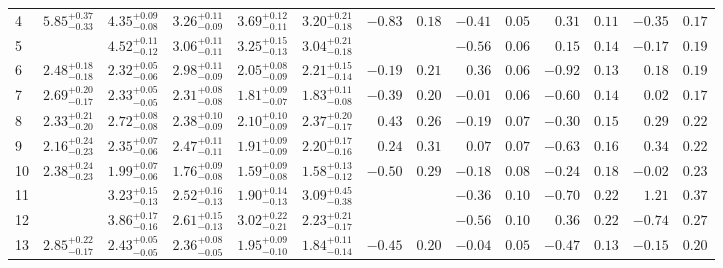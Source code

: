 \begin{tabular}{@{}l ccccc r@{ $\pm$ }l r@{ $\pm$ }l r@{ $\pm$ }l r@{ $\pm$ }l @{}}
\cmidrule{1-14}
4 & ${5.85}^{+0.37}_{-0.33}$ & ${4.35}^{+0.09}_{-0.08}$ & ${3.26}^{+0.11}_{-0.09}$ & ${3.69}^{+0.12}_{-0.11}$ & ${3.20}^{+0.21}_{-0.18}$
  & $-0.83$ & $0.18$ & $-0.41$ & $0.05$ & $0.31$ & $0.11$ & $-0.35$ & $0.17$ \\ [0.5em]
5 & {} & ${4.52}^{+0.11}_{-0.12}$ & ${3.06}^{+0.11}_{-0.11}$ & ${3.25}^{+0.15}_{-0.13}$ & ${3.04}^{+0.21}_{-0.18}$
  & \multicolumn{2}{c}{} & $-0.56$ & $0.06$ & $0.15$ & $0.14$ & $-0.17$ & $0.19$ \\ [0.5em]
6 & ${2.48}^{+0.18}_{-0.18}$ & ${2.32}^{+0.05}_{-0.06}$ & ${2.98}^{+0.11}_{-0.09}$ & ${2.05}^{+0.08}_{-0.09}$ & ${2.21}^{+0.15}_{-0.14}$
  & $-0.19$ & $0.21$ & $0.36$ & $0.06$ & $-0.92$ & $0.13$ & $0.18$ & $0.19$ \\ [0.5em]
7 & ${2.69}^{+0.20}_{-0.17}$ & ${2.33}^{+0.05}_{-0.05}$ & ${2.31}^{+0.08}_{-0.08}$ & ${1.81}^{+0.09}_{-0.07}$ & ${1.83}^{+0.11}_{-0.08}$
  & $-0.39$ & $0.20$ & $-0.01$ & $0.06$ & $-0.60$ & $0.14$ & $0.02$ & $0.17$ \\ [0.5em]
8 & ${2.33}^{+0.21}_{-0.20}$ & ${2.72}^{+0.08}_{-0.08}$ & ${2.38}^{+0.10}_{-0.09}$ & ${2.10}^{+0.10}_{-0.09}$ & ${2.37}^{+0.20}_{-0.17}$
  & $0.43$ & $0.26$ & $-0.19$ & $0.07$ & $-0.30$ & $0.15$ & $0.29$ & $0.22$ \\ [0.5em]
9 & ${2.16}^{+0.24}_{-0.23}$ & ${2.35}^{+0.07}_{-0.06}$ & ${2.47}^{+0.11}_{-0.11}$ & ${1.91}^{+0.09}_{-0.09}$ & ${2.20}^{+0.17}_{-0.16}$
  & $0.24$ & $0.31$ & $0.07$ & $0.07$ & $-0.63$ & $0.16$ & $0.34$ & $0.22$ \\ [0.5em]
10 & ${2.38}^{+0.24}_{-0.23}$ & ${1.99}^{+0.07}_{-0.06}$ & ${1.76}^{+0.09}_{-0.08}$ & ${1.59}^{+0.09}_{-0.08}$ & ${1.58}^{+0.13}_{-0.12}$
  & $-0.50$ & $0.29$ & $-0.18$ & $0.08$ & $-0.24$ & $0.18$ & $-0.02$ & $0.23$ \\

\cmidrule{1-14}
11 & {} & ${3.23}^{+0.15}_{-0.13}$ & ${2.52}^{+0.16}_{-0.13}$ & ${1.90}^{+0.14}_{-0.13}$ & ${3.09}^{+0.45}_{-0.38}$
  & \multicolumn{2}{c}{} & $-0.36$ & $0.10$ & $-0.70$ & $0.22$ & $1.21$ & $0.37$ \\ [0.5em]
12 & {} & ${3.86}^{+0.17}_{-0.16}$ & ${2.61}^{+0.15}_{-0.13}$ & ${3.02}^{+0.22}_{-0.21}$ & ${2.23}^{+0.21}_{-0.17}$
  & \multicolumn{2}{c}{} & $-0.56$ & $0.10$ & $0.36$ & $0.22$ & $-0.74$ & $0.27$ \\ [0.5em]
13 & ${2.85}^{+0.22}_{-0.17}$ & ${2.43}^{+0.05}_{-0.05}$ & ${2.36}^{+0.08}_{-0.05}$ & ${1.95}^{+0.09}_{-0.10}$ & ${1.84}^{+0.11}_{-0.14}$
  & $-0.45$ & $0.20$ & $-0.04$ & $0.05$ & $-0.47$ & $0.13$ & $-0.15$ & $0.20$ \\


\end{tabular}
